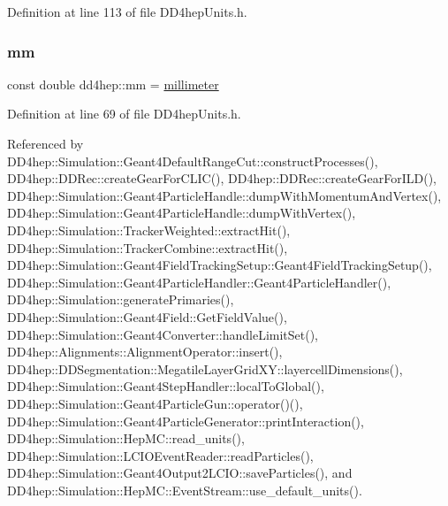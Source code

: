 Definition at line 113 of file D\+D4hep\+Units.\+h.

\hypertarget{namespacedd4hep_a124f4e9c11400c971e1a829ba8d4a3d0}{}\label{namespacedd4hep_a124f4e9c11400c971e1a829ba8d4a3d0} 
\subsubsection{\texorpdfstring{mm}{mm}}
{\footnotesize\ttfamily const double dd4hep\+::mm = \hyperlink{namespacedd4hep_a1b3044c28560621f033b6f0fb9a15854}{millimeter}\hspace{0.3cm}{\ttfamily [static]}}



Definition at line 69 of file D\+D4hep\+Units.\+h.



Referenced by D\+D4hep\+::\+Simulation\+::\+Geant4\+Default\+Range\+Cut\+::construct\+Processes(), D\+D4hep\+::\+D\+D\+Rec\+::create\+Gear\+For\+C\+L\+I\+C(), D\+D4hep\+::\+D\+D\+Rec\+::create\+Gear\+For\+I\+L\+D(), D\+D4hep\+::\+Simulation\+::\+Geant4\+Particle\+Handle\+::dump\+With\+Momentum\+And\+Vertex(), D\+D4hep\+::\+Simulation\+::\+Geant4\+Particle\+Handle\+::dump\+With\+Vertex(), D\+D4hep\+::\+Simulation\+::\+Tracker\+Weighted\+::extract\+Hit(), D\+D4hep\+::\+Simulation\+::\+Tracker\+Combine\+::extract\+Hit(), D\+D4hep\+::\+Simulation\+::\+Geant4\+Field\+Tracking\+Setup\+::\+Geant4\+Field\+Tracking\+Setup(), D\+D4hep\+::\+Simulation\+::\+Geant4\+Particle\+Handler\+::\+Geant4\+Particle\+Handler(), D\+D4hep\+::\+Simulation\+::generate\+Primaries(), D\+D4hep\+::\+Simulation\+::\+Geant4\+Field\+::\+Get\+Field\+Value(), D\+D4hep\+::\+Simulation\+::\+Geant4\+Converter\+::handle\+Limit\+Set(), D\+D4hep\+::\+Alignments\+::\+Alignment\+Operator\+::insert(), D\+D4hep\+::\+D\+D\+Segmentation\+::\+Megatile\+Layer\+Grid\+X\+Y\+::layercell\+Dimensions(), D\+D4hep\+::\+Simulation\+::\+Geant4\+Step\+Handler\+::local\+To\+Global(), D\+D4hep\+::\+Simulation\+::\+Geant4\+Particle\+Gun\+::operator()(), D\+D4hep\+::\+Simulation\+::\+Geant4\+Particle\+Generator\+::print\+Interaction(), D\+D4hep\+::\+Simulation\+::\+Hep\+M\+C\+::read\+\_\+units(), D\+D4hep\+::\+Simulation\+::\+L\+C\+I\+O\+Event\+Reader\+::read\+Particles(), D\+D4hep\+::\+Simulation\+::\+Geant4\+Output2\+L\+C\+I\+O\+::save\+Particles(), and D\+D4hep\+::\+Simulation\+::\+Hep\+M\+C\+::\+Event\+Stream\+::use\+\_\+default\+\_\+units().

\hypertarget{namespacedd4hep_a637e0a0b1e9c316aa5581b95204d4fe3}{}\label{namespacedd4hep_a637e0a0b1e9c316aa5581b95204d4fe3} 
